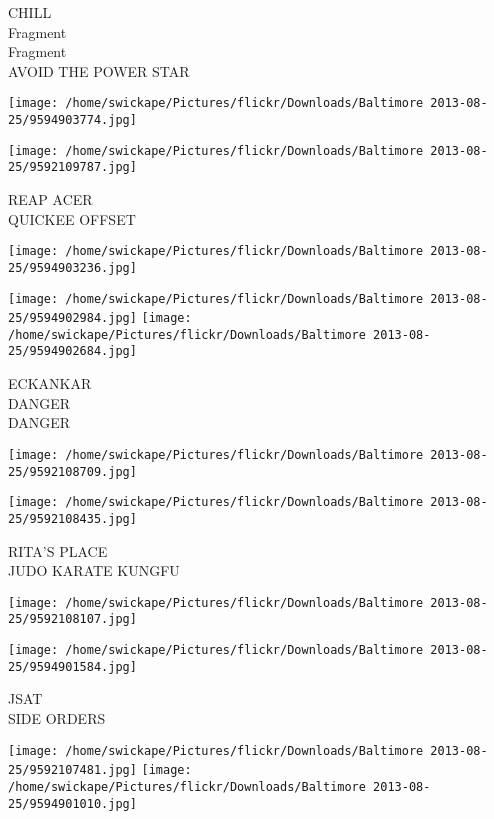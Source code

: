 \documentclass[10pt,letterpaper]{article}
\begin{document}
CHILL\\
Fragment\\
Fragment\\
AVOID THE POWER STAR\\
\pagebreak

\texttt{[image: /home/swickape/Pictures/flickr/Downloads/Baltimore 2013-08-25/9594903774.jpg]}

\vspace{0.25in}
\texttt{[image: /home/swickape/Pictures/flickr/Downloads/Baltimore 2013-08-25/9592109787.jpg]}

REAP ACER\\
QUICKEE OFFSET\\
\pagebreak

\texttt{[image: /home/swickape/Pictures/flickr/Downloads/Baltimore 2013-08-25/9594903236.jpg]}

\vspace{0.25in}
\texttt{[image: /home/swickape/Pictures/flickr/Downloads/Baltimore 2013-08-25/9594902984.jpg]}
\texttt{[image: /home/swickape/Pictures/flickr/Downloads/Baltimore 2013-08-25/9594902684.jpg]}

ECKANKAR\\
DANGER\\
DANGER\\
\pagebreak

\texttt{[image: /home/swickape/Pictures/flickr/Downloads/Baltimore 2013-08-25/9592108709.jpg]}

\vspace{0.25in}
\texttt{[image: /home/swickape/Pictures/flickr/Downloads/Baltimore 2013-08-25/9592108435.jpg]}

RITA'S PLACE\\
JUDO KARATE KUNGFU\\
\pagebreak

\texttt{[image: /home/swickape/Pictures/flickr/Downloads/Baltimore 2013-08-25/9592108107.jpg]}

\vspace{0.25in}
\texttt{[image: /home/swickape/Pictures/flickr/Downloads/Baltimore 2013-08-25/9594901584.jpg]}

JSAT\\
SIDE ORDERS\\
\pagebreak

\texttt{[image: /home/swickape/Pictures/flickr/Downloads/Baltimore 2013-08-25/9592107481.jpg]}
\texttt{[image: /home/swickape/Pictures/flickr/Downloads/Baltimore 2013-08-25/9594901010.jpg]}
\end{document}
